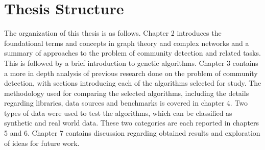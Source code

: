 \section{Thesis Structure}
The organization of this thesis is as follows. Chapter 2 introduces the foundational terms and concepts in graph theory and complex networks and a summary of approaches to the problem of community detection and related tasks. This is followed by a brief introduction to genetic algorithms. Chapter 3 contains a more in depth analysis of previous research done on the problem of community detection, with sections introducing each of the algorithms selected for study. The methodology used for comparing the selected algorithms, including the details regarding libraries, data sources and benchmarks is covered in chapter 4. Two types of data were used to test the algorithms, which can be classified as synthetic and real world data. These two categories are each reported in chapters 5 and 6. Chapter 7 contains discussion regarding obtained results and exploration of ideas for future work.